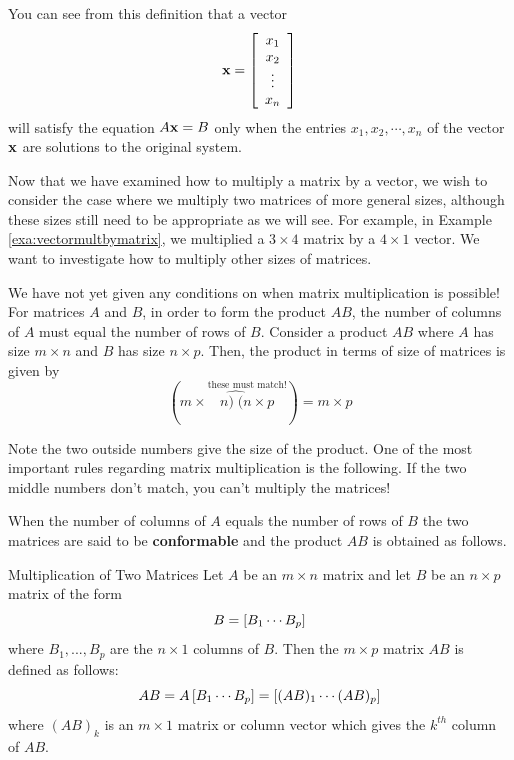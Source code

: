 You can see from this definition that a vector 
\begin{equation*}
\mathbf{x} =
\left[
\begin{array}{c}
x_{1} \\
x_{2} \\
\vdots \\
x_{n}
\end{array}
\right]
\end{equation*}
will satisfy the equation $A\mathbf{x}=B$
only when the entries $x_{1}, x_{2}, \cdots, x_{n}$ of the vector $\mathbf{x}$ are solutions to the original system.

Now that we have examined how to multiply a matrix by a vector, we
wish to consider the case where we multiply two matrices of more
general sizes, although these sizes still need to be appropriate as we
will see. For example, in Example \ref{exa:vectormultbymatrix}, we
multiplied a $3 \times 4$ matrix by a $4 \times 1$ vector.  We want to
investigate how to multiply other sizes of matrices.

We have not yet given any conditions on when matrix multiplication is
possible!  For matrices $A$ and $B$, in order to form the product
$AB$, the number of columns of $A$ must equal the number of rows of
$B.$ Consider a product $AB$ where $A$ has size $m\times n$ and $B$
has size $n \times p$. Then, the product in terms of size of matrices
is given by
\begin{equation*}
(m\times\overset{\text{these must match!}}{\widehat{n)\;(n}\times p})=m\times p
\end{equation*}

Note the two outside numbers give the size of the product. One of the most important rules regarding matrix multiplication is the following. 
If the two middle numbers don't match, you can't multiply the
matrices!

When the number of columns of $A$ equals the number of rows
of $B$ the two matrices are said to be \textbf{conformable}
 and the product $AB$ is obtained
 as follows.

\begin{definition}{Multiplication of Two Matrices}\label{def:multiplicationoftwomatrices}
 Let $A$ be an $m\times n$ matrix
and let $B$ be an $n\times p$ matrix of the form
\begin{equation*}
B=\left[ B_{1} \cdots  B_{p}\right]
\end{equation*}
where $B_{1},...,B_{p}$ are the $n\times 1$ columns of $B$. Then the 
$m\times p$ matrix $AB$ is defined as follows:
\begin{equation*}
AB = A \left[ B_{1} \cdots  B_{p}\right] =  \left[ (A B)_{1} \cdots  (AB)_{p}\right] 
\end{equation*}
where $(AB)_{k}$ is an $m\times 1$ matrix or column vector which
gives the $k^{th}$ column of $AB$. 
\end{definition}

